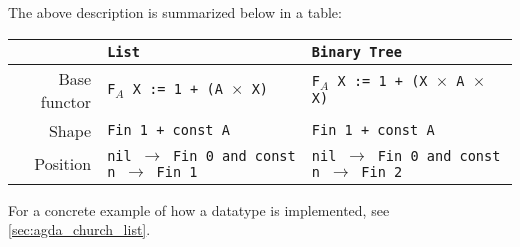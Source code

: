The above description is summarized below in a table:
\begin{table}[h]
  \begin{tabular}{|r|l|l|}\hline
     & \tt{List} &  \tt{Binary Tree} \\\hline
    Base functor         & \tt{F$_A$ X := 1 + (A $\times$ X)}  & \tt{F$_A$ X := 1 + (X $\times$ A $\times$ X)} \\\hline
    Shape  & \tt{Fin 1 + const A} & \tt{Fin 1 + const A} \\\hline
    Position & \tt{nil $\to$ Fin 0 and const n $\to$ Fin 1} & \tt{nil $\to$ Fin 0 and const n $\to$ Fin 2} \\\hline
  \end{tabular}
\end{table}

For a concrete example of how a datatype is implemented, see \autoref{sec:agda_church_list}.